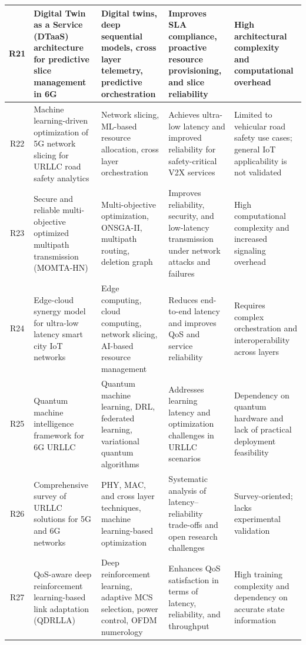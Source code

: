 \documentclass[a4paper,fleqn]{cas-dc}
\numberwithin{equation}{section}
\begin{document}
\begin{table}[h]
\begin{tabular}{|c|p{3.7cm}|p{4.5cm}|p{4.5cm}|p{3.7cm}|}
R21 & Digital Twin as a Service (DTaaS) architecture for predictive slice management in 6G \cite{bilen2025modular}& Digital twins, deep sequential models, cross layer telemetry, predictive orchestration & Improves SLA compliance, proactive resource provisioning, and slice reliability & High architectural complexity and computational overhead \\
\hline

R22 & Machine learning-driven optimization of 5G network slicing for URLLC road safety analytics \cite{dlamini2024enhancing}& Network slicing, ML-based resource allocation, cross layer orchestration & Achieves ultra-low latency and improved reliability for safety-critical V2X services & Limited to vehicular road safety use cases; general IoT applicability is not validated \\
\hline

R23 & Secure and reliable multi-objective optimized multipath transmission (MOMTA-HN)\cite{qi2024momta} & Multi-objective optimization, ONSGA-II, multipath routing, deletion graph & Improves reliability, security, and low-latency transmission under network attacks and failures & High computational complexity and increased signaling overhead \\
\hline

R24 & Edge-cloud synergy model for ultra-low latency smart city IoT networks \cite{zhang2025edge}& Edge computing, cloud computing, network slicing, AI-based resource management & Reduces end-to-end latency and improves QoS and service reliability & Requires complex orchestration and interoperability across layers \\
\hline

R25 & Quantum machine intelligence framework for 6G URLLC \cite{zaman2023quantum}& Quantum machine learning, DRL, federated learning, variational quantum algorithms & Addresses learning latency and optimization challenges in URLLC scenarios & Dependency on quantum hardware and lack of practical deployment feasibility \\
\hline

R26 & Comprehensive survey of URLLC solutions for 5G and 6G networks \cite{haque2025comprehensive}& PHY, MAC, and cross layer techniques, machine learning-based optimization & Systematic analysis of latency--reliability trade-offs and open research challenges & Survey-oriented; lacks experimental validation \\
\hline

R27 & QoS-aware deep reinforcement learning-based link adaptation (QDRLLA) \cite{parsa2025qos}& Deep reinforcement learning, adaptive MCS selection, power control, OFDM numerology & Enhances QoS satisfaction in terms of latency, reliability, and throughput & High training complexity and dependency on accurate state information \\
\hline


\end{tabular}
\end{table}
\end{document}
